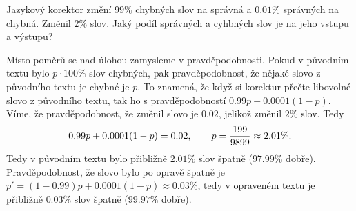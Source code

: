 \documentclass[12pt]{article}					%
\begin{document}
\begin{priklad}[3]
    Jazykový korektor změní $99\%$ chybných slov na správná a $0.01\%$ správných na chybná. Změnil $2\%$ slov. Jaký podíl správných a cyhbných slov je na jeho vstupu a výstupu?

    \begin{reseni}
        Místo poměrů se nad úlohou zamysleme v pravděpodobnosti. Pokud v původním textu bylo $p·100\%$ slov chybných, pak pravděpodobnost, že nějaké slovo z původního textu je chybné je $p$. To znamená, že když si korektur přečte libovolné slovo z původního textu, tak ho s pravděpodobností $0.99p + 0.0001(1-p)$. Víme, že pravděpodobnost, že změnil slovo je $0.02$, jelikož změnil $2\%$ slov. Tedy
        $$ 0.99p + 0.0001(1-p) = 0.02, \hskip 2em p = \frac{199}{9899} \approx 2.01\%. $$
        Tedy v původním textu bylo přibližně $2.01\%$ slov špatně ($97.99\%$ dobře). Pravděpodobnost, že slovo bylo po opravě špatně je $p' = (1-0.99)p + 0.0001(1-p) \approx 0.03\%$, tedy v opraveném textu je přibližně $0.03\%$ slov špatně ($99.97\%$ dobře).
    \end{reseni}
\end{priklad}
\end{document}
